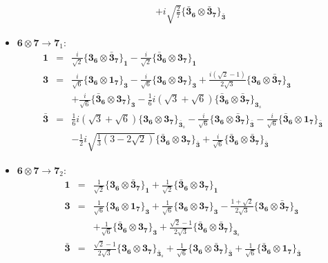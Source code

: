 \documentclass[english]{article}
\newcommand{\subcg}[3]{\big\{ {#1}\otimes{#2}\big\}^{}_{#3}}
\newcommand{\rep}[1]{\mathbf{#1}}
\begin{document}
\begin{itemize}
\begin{eqnarray*}
 & & +i \sqrt{\frac{2}{7}}\subcg{\rep{\bar{3}}_{\rep{6}}}{\rep{\bar{3}}_{\rep{7}}}{\rep{\bar{3}}}
\end{eqnarray*}
\item $\rep{6}\otimes\rep{7}\to\rep{7}_{1}$:
\begin{eqnarray*}
\rep{1} &=& \frac{i}{\sqrt{2}}\subcg{\rep{3}_{\rep{6}}}{\rep{\bar{3}}_{\rep{7}}}{\rep{1}}-\frac{i}{\sqrt{2}}\subcg{\rep{\bar{3}}_{\rep{6}}}{\rep{3}_{\rep{7}}}{\rep{1}}
\\
\rep{3} &=& \frac{i}{\sqrt{6}}\subcg{\rep{3}_{\rep{6}}}{\rep{1}_{\rep{7}}}{\rep{3}}-\frac{i}{\sqrt{6}}\subcg{\rep{3}_{\rep{6}}}{\rep{3}_{\rep{7}}}{\rep{3}}+\frac{i \left(\sqrt{2}-1\right)}{2 \sqrt{3}}\subcg{\rep{3}_{\rep{6}}}{\rep{\bar{3}}_{\rep{7}}}{\rep{3}} \\ 
 & & +\frac{i}{\sqrt{6}}\subcg{\rep{\bar{3}}_{\rep{6}}}{\rep{3}_{\rep{7}}}{\rep{3}}-\frac{1}{6} i \left(\sqrt{3}+\sqrt{6}\right)\subcg{\rep{\bar{3}}_{\rep{6}}}{\rep{\bar{3}}_{\rep{7}}}{\rep{3}_{s}}
\\
\rep{\bar{3}} &=& \frac{1}{6} i \left(\sqrt{3}+\sqrt{6}\right)\subcg{\rep{3}_{\rep{6}}}{\rep{3}_{\rep{7}}}{\rep{\bar{3}}_{s}}-\frac{i}{\sqrt{6}}\subcg{\rep{3}_{\rep{6}}}{\rep{\bar{3}}_{\rep{7}}}{\rep{\bar{3}}}-\frac{i}{\sqrt{6}}\subcg{\rep{\bar{3}}_{\rep{6}}}{\rep{1}_{\rep{7}}}{\rep{\bar{3}}} \\ 
 & & -\frac{1}{2} i \sqrt{\frac{1}{3} \left(3-2 \sqrt{2}\right)}\subcg{\rep{\bar{3}}_{\rep{6}}}{\rep{3}_{\rep{7}}}{\rep{\bar{3}}}+\frac{i}{\sqrt{6}}\subcg{\rep{\bar{3}}_{\rep{6}}}{\rep{\bar{3}}_{\rep{7}}}{\rep{\bar{3}}}
\end{eqnarray*}
\item $\rep{6}\otimes\rep{7}\to\rep{7}_{2}$:
\begin{eqnarray*}
\rep{1} &=& \frac{1}{\sqrt{2}}\subcg{\rep{3}_{\rep{6}}}{\rep{\bar{3}}_{\rep{7}}}{\rep{1}}+\frac{1}{\sqrt{2}}\subcg{\rep{\bar{3}}_{\rep{6}}}{\rep{3}_{\rep{7}}}{\rep{1}}
\\
\rep{3} &=& \frac{1}{\sqrt{6}}\subcg{\rep{3}_{\rep{6}}}{\rep{1}_{\rep{7}}}{\rep{3}}+\frac{1}{\sqrt{6}}\subcg{\rep{3}_{\rep{6}}}{\rep{3}_{\rep{7}}}{\rep{3}}-\frac{1+\sqrt{2}}{2 \sqrt{3}}\subcg{\rep{3}_{\rep{6}}}{\rep{\bar{3}}_{\rep{7}}}{\rep{3}} \\ 
 & & +\frac{1}{\sqrt{6}}\subcg{\rep{\bar{3}}_{\rep{6}}}{\rep{3}_{\rep{7}}}{\rep{3}}+\frac{\sqrt{2}-1}{2 \sqrt{3}}\subcg{\rep{\bar{3}}_{\rep{6}}}{\rep{\bar{3}}_{\rep{7}}}{\rep{3}_{s}}
\\
\rep{\bar{3}} &=& \frac{\sqrt{2}-1}{2 \sqrt{3}}\subcg{\rep{3}_{\rep{6}}}{\rep{3}_{\rep{7}}}{\rep{\bar{3}}_{s}}+\frac{1}{\sqrt{6}}\subcg{\rep{3}_{\rep{6}}}{\rep{\bar{3}}_{\rep{7}}}{\rep{\bar{3}}}+\frac{1}{\sqrt{6}}\subcg{\rep{\bar{3}}_{\rep{6}}}{\rep{1}_{\rep{7}}}{\rep{\bar{3}}} \\ 

\end{eqnarray*}
\end{itemize}
\end{document}
